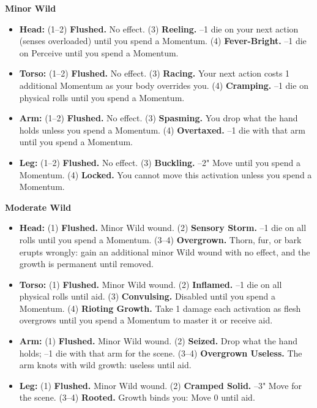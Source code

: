 \textbf{Minor Wild}
\begin{itemize}
    \item \textbf{Head:} (1--2) \textbf{Flushed.} No effect. (3) \textbf{Reeling.} --1 die on your next action (senses overloaded) until you spend a Momentum. (4) \textbf{Fever-Bright.} --1 die on Perceive until you spend a Momentum.
    \item \textbf{Torso:} (1--2) \textbf{Flushed.} No effect. (3) \textbf{Racing.} Your next action costs 1 additional Momentum as your body overrides you. (4) \textbf{Cramping.} --1 die on physical rolls until you spend a Momentum.
    \item \textbf{Arm:} (1--2) \textbf{Flushed.} No effect. (3) \textbf{Spasming.} You drop what the hand holds unless you spend a Momentum. (4) \textbf{Overtaxed.} --1 die with that arm until you spend a Momentum.
    \item \textbf{Leg:} (1--2) \textbf{Flushed.} No effect. (3) \textbf{Buckling.} --2" Move until you spend a Momentum. (4) \textbf{Locked.} You cannot move this activation unless you spend a Momentum.
\end{itemize}

\textbf{Moderate Wild}
\begin{itemize}
    \item \textbf{Head:} (1) \textbf{Flushed.} Minor Wild wound. (2) \textbf{Sensory Storm.} --1 die on all rolls until you spend a Momentum. (3--4) \textbf{Overgrown.} Thorn, fur, or bark erupts wrongly: gain an additional minor Wild wound with no effect, and the growth is permanent until removed.
    \item \textbf{Torso:} (1) \textbf{Flushed.} Minor Wild wound. (2) \textbf{Inflamed.} --1 die on all physical rolls until aid. (3) \textbf{Convulsing.} Disabled until you spend a Momentum. (4) \textbf{Rioting Growth.} Take 1 damage each activation as flesh overgrows until you spend a Momentum to master it or receive aid.
    \item \textbf{Arm:} (1) \textbf{Flushed.} Minor Wild wound. (2) \textbf{Seized.} Drop what the hand holds; --1 die with that arm for the scene. (3--4) \textbf{Overgrown Useless.} The arm knots with wild growth: useless until aid.
    \item \textbf{Leg:} (1) \textbf{Flushed.} Minor Wild wound. (2) \textbf{Cramped Solid.} --3" Move for the scene. (3--4) \textbf{Rooted.} Growth binds you: Move 0 until aid.
\end{itemize}

